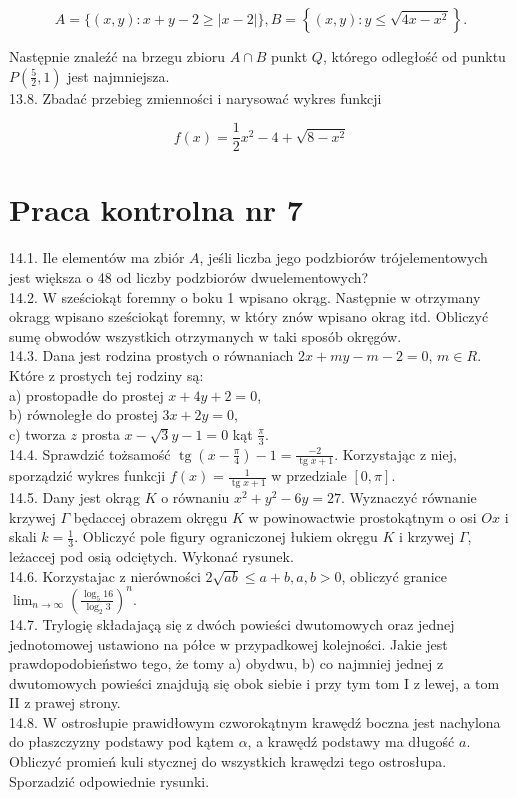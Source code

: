 \documentclass[10pt]{article}
\begin{document}
$$
A=\{(x, y): x+y-2 \geq|x-2|\}, B=\left\{(x, y): y \leq \sqrt{4 x-x^{2}}\right\} .
$$

Następnie znaleźć na brzegu zbioru $A \cap B$ punkt $Q$, którego odległość od punktu $P\left(\frac{5}{2}, 1\right)$ jest najmniejsza.\\
13.8. Zbadać przebieg zmienności i narysować wykres funkcji

$$
f(x)=\frac{1}{2} x^{2}-4+\sqrt{8-x^{2}}
$$

\section*{Praca kontrolna nr 7}
14.1. Ile elementów ma zbiór $A$, jeśli liczba jego podzbiorów trójelementowych jest większa o 48 od liczby podzbiorów dwuelementowych?\\
14.2. W sześciokąt foremny o boku 1 wpisano okrąg. Następnie w otrzymany okragg wpisano sześciokąt foremny, w który znów wpisano okrag itd. Obliczyć sumę obwodów wszystkich otrzymanych w taki sposób okręgów.\\
14.3. Dana jest rodzina prostych o równaniach $2 x+m y-m-2=0$, $m \in R$. Które z prostych tej rodziny są:\\
a) prostopadłe do prostej $x+4 y+2=0$,\\
b) równoległe do prostej $3 x+2 y=0$,\\
c) tworza $z$ prosta $x-\sqrt{3} y-1=0$ kąt $\frac{\pi}{3}$.\\
14.4. Sprawdzić tożsamość $\operatorname{tg}\left(x-\frac{\pi}{4}\right)-1=\frac{-2}{\operatorname{tg} x+1}$. Korzystając z niej, sporządzić wykres funkcji $f(x)=\frac{1}{\operatorname{tg} x+1}$ w przedziale $[0, \pi]$.\\
14.5. Dany jest okrąg $K$ o równaniu $x^{2}+y^{2}-6 y=27$. Wyznaczyć równanie krzywej $\Gamma$ będaccej obrazem okręgu $K$ w powinowactwie prostokątnym o osi $O x$ i skali $k=\frac{1}{3}$. Obliczyć pole figury ograniczonej łukiem okręgu $K$ i krzywej $\Gamma$, leżaccej pod osią odciętych. Wykonać rysunek.\\
14.6. Korzystajac z nierówności $2 \sqrt{a b} \leq a+b, a, b>0$, obliczyć granice $\lim _{n \rightarrow \infty}\left(\frac{\log _{5} 16}{\log _{2} 3}\right)^{n}$.\\
14.7. Trylogię składajaçą się z dwóch powieści dwutomowych oraz jednej jednotomowej ustawiono na półce w przypadkowej kolejności. Jakie jest prawdopodobieństwo tego, że tomy a) obydwu, b) co najmniej jednej z dwutomowych powieści znajdują się obok siebie i przy tym tom I z lewej, a tom II z prawej strony.\\
14.8. W ostrosłupie prawidłowym czworokątnym krawędź boczna jest nachylona do płaszczyzny podstawy pod kątem $\alpha$, a krawędź podstawy ma długość $a$. Obliczyć promień kuli stycznej do wszystkich krawędzi tego ostrosłupa. Sporzadzić odpowiednie rysunki.
\end{document}
